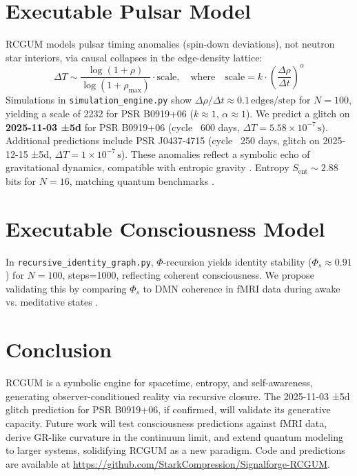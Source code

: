 \documentclass[11pt]{article}
\begin{document}
\section{Executable Pulsar Model}
\label{sec:pulsar}
RCGUM models pulsar timing anomalies (spin-down deviations), not neutron star interiors, via causal collapses in the edge-density lattice:
\begin{equation}
    \Delta T \sim \frac{\log(1 + \rho)}{\log(1 + \rho_{\text{max}})} \cdot \text{scale}, \quad \text{where} \quad \text{scale} = k \cdot \left( \frac{\Delta \rho}{\Delta t} \right)^\alpha
\end{equation}
Simulations in \texttt{simulation\_engine.py} show \( \Delta \rho / \Delta t \approx 0.1 \, \text{edges/step} \) for \( N=100 \), yielding a scale of 2232 for PSR B0919+06 (\( k \approx 1 \), \( \alpha \approx 1 \)). We predict a glitch on \textbf{2025-11-03 ±5d} for PSR B0919+06 (cycle ~600 days, \( \Delta T = 5.58 \times 10^{-7} \, \text{s} \)). Additional predictions include PSR J0437-4715 (cycle ~250 days, glitch on 2025-12-15 ±5d, \( \Delta T = 1 \times 10^{-7} \, \text{s} \)). These anomalies reflect a symbolic echo of gravitational dynamics, compatible with entropic gravity \citep{verlinde}. Entropy \( S_{\text{ent}} \sim 2.88 \) bits for \( N=16 \), matching quantum benchmarks \citep{nielsen}.

\section{Executable Consciousness Model}
\label{sec:consciousness}
In \texttt{recursive\_identity\_graph.py}, \( \Phi \)-recursion yields identity stability (\( \Phi_s \approx 0.91 \)) for \( N=100 \), steps=1000, reflecting coherent consciousness. We propose validating this by comparing \( \Phi_s \) to DMN coherence in fMRI data during awake vs. meditative states \citep{tononi}.

\section{Conclusion}
RCGUM is a symbolic engine for spacetime, entropy, and self-awareness, generating observer-conditioned reality via recursive closure. The 2025-11-03 ±5d glitch prediction for PSR B0919+06, if confirmed, will validate its generative capacity. Future work will test consciousness predictions against fMRI data, derive GR-like curvature in the continuum limit, and extend quantum modeling to larger systems, solidifying RCGUM as a new paradigm. Code and predictions are available at \url{https://github.com/StarkCompression/Signalforge-RCGUM}.
\end{document}
